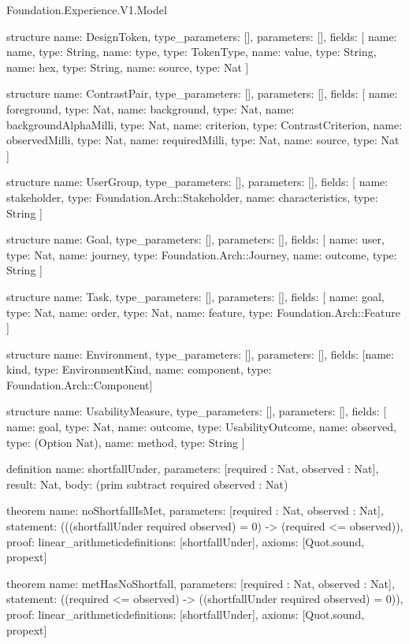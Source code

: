 \begin{lexlean}{Foundation.Experience.V1.Model}
\begin{semanticmodule}
structure{
  name: DesignToken,
  type_parameters: [],
  parameters: [],
  fields: [
    {name: name, type: String},
    {name: type, type: TokenType},
    {name: value, type: String},
    {name: hex, type: String},
    {name: source, type: Nat}
  ]
}

structure{
  name: ContrastPair,
  type_parameters: [],
  parameters: [],
  fields: [
    {name: foreground, type: Nat},
    {name: background, type: Nat},
    {name: backgroundAlphaMilli, type: Nat},
    {name: criterion, type: ContrastCriterion},
    {name: observedMilli, type: Nat},
    {name: requiredMilli, type: Nat},
    {name: source, type: Nat}
  ]
}

structure{
  name: UserGroup,
  type_parameters: [],
  parameters: [],
  fields: [
    {name: stakeholder, type: Foundation.Arch::Stakeholder},
    {name: characteristics, type: String}
  ]
}

structure{
  name: Goal,
  type_parameters: [],
  parameters: [],
  fields: [
    {name: user, type: Nat},
    {name: journey, type: Foundation.Arch::Journey},
    {name: outcome, type: String}
  ]
}

structure{
  name: Task,
  type_parameters: [],
  parameters: [],
  fields: [
    {name: goal, type: Nat},
    {name: order, type: Nat},
    {name: feature, type: Foundation.Arch::Feature}
  ]
}

structure{
  name: Environment,
  type_parameters: [],
  parameters: [],
  fields: [{name: kind, type: EnvironmentKind}, {name: component, type: Foundation.Arch::Component}]
}

structure{
  name: UsabilityMeasure,
  type_parameters: [],
  parameters: [],
  fields: [
    {name: goal, type: Nat},
    {name: outcome, type: UsabilityOutcome},
    {name: observed, type: (Option Nat)},
    {name: method, type: String}
  ]
}

definition{
  name: shortfallUnder,
  parameters: [required : Nat, observed : Nat],
  result: Nat,
  body: (prim subtract required observed : Nat)
}

theorem{
  name: noShortfallIsMet,
  parameters: [required : Nat, observed : Nat],
  statement: (((shortfallUnder required observed) = 0) -> (required <= observed)),
  proof: linear_arithmetic{definitions: [shortfallUnder]},
  axioms: [Quot.sound, propext]
}

theorem{
  name: metHasNoShortfall,
  parameters: [required : Nat, observed : Nat],
  statement: ((required <= observed) -> ((shortfallUnder required observed) = 0)),
  proof: linear_arithmetic{definitions: [shortfallUnder]},
  axioms: [Quot.sound, propext]
}


\end{semanticmodule}
\end{lexlean}
